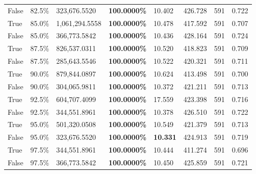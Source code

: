 \begin{table}[H]
\begin{tabular}{lllrllll}
\cline{1-8}
False & 82.5\% & 323,676.5520 & \bfseries \color{red} 100.0000\% & 10.402 & 426.728 & 591 & 0.722 \\
\cline{1-8}
True & 85.0\% & 1,061,294.5558 & \bfseries \color{red} 100.0000\% & 10.478 & 417.592 & 591 & 0.707 \\
\cline{1-8}
False & 85.0\% & 366,773.5842 & \bfseries \color{red} 100.0000\% & 10.436 & 428.164 & 591 & 0.724 \\
\cline{1-8}
True & 87.5\% & 826,537.0311 & \bfseries \color{red} 100.0000\% & 10.520 & 418.823 & 591 & 0.709 \\
\cline{1-8}
False & 87.5\% & \color{red} 285,643.5546 & \bfseries \color{red} 100.0000\% & 10.522 & 420.321 & 591 & 0.711 \\
\cline{1-8}
True & 90.0\% & 879,844.0897 & \bfseries \color{red} 100.0000\% & 10.624 & 413.498 & 591 & 0.700 \\
\cline{1-8}
False & 90.0\% & 304,065.9811 & \bfseries \color{red} 100.0000\% & 10.372 & 421.211 & 591 & 0.713 \\
\cline{1-8}
True & 92.5\% & 604,707.4099 & \bfseries \color{red} 100.0000\% & 17.559 & 423.398 & 591 & 0.716 \\
\cline{1-8}
False & 92.5\% & 344,551.8961 & \bfseries \color{red} 100.0000\% & 10.378 & 426.510 & 591 & 0.722 \\
\cline{1-8}
True & 95.0\% & 501,320.0508 & \bfseries \color{red} 100.0000\% & 10.549 & 421.379 & 591 & 0.713 \\
\cline{1-8}
False & 95.0\% & 323,676.5520 & \bfseries \color{red} 100.0000\% & \bfseries \color{red} 10.331 & 424.913 & 591 & 0.719 \\
\cline{1-8}
True & 97.5\% & 344,551.8961 & \bfseries \color{red} 100.0000\% & 10.444 & 411.274 & 591 & 0.696 \\
\cline{1-8}
False & 97.5\% & 366,773.5842 & \bfseries \color{red} 100.0000\% & 10.450 & 425.859 & 591 & 0.721 \\
\cline{1-8}
\bottomrule
\end{tabular}
\end{table}
